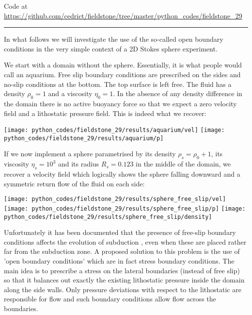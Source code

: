 

\begin{center}
Code at \url{https://github.com/cedrict/fieldstone/tree/master/python_codes/fieldstone_29}
\end{center}

\par\noindent\rule{\textwidth}{0.4pt}

\Literature \cite{chgv12}

In what follows we will investigate the use of the so-called open boundary conditions in 
the very simple context of a 2D Stokes sphere experiment. 

We start with a domain without the sphere. Essentially, it is what people would 
call an aquarium.
Free slip boundary conditions are prescribed on the sides and no-slip conditions at the bottom. 
The top surface is left free. The fluid has a density $\rho_0=1$ and a viscosity $\eta_0=1$.
In the absence of any density difference in the domain there is no active buoyancy force
so that we expect a zero velocity field and a lithostatic pressure field. 
This is indeed what we recover:  

\begin{center}
\texttt{[image: python\_codes/fieldstone\_29/results/aquarium/vel]}
\texttt{[image: python\_codes/fieldstone\_29/results/aquarium/p]}
\end{center}

If we now implement a sphere parametrised by its density $\rho_s=\rho_0+1$, its 
viscosity $\eta_s=10^3$ and its radius $R_s=0.123$ in the middle of the domain,  
we recover a velocity field which logically shows the sphere falling downward and 
a symmetric return flow of the fluid on each side:

\begin{center}
\texttt{[image: python\_codes/fieldstone\_29/results/sphere\_free\_slip/vel]}
\texttt{[image: python\_codes/fieldstone\_29/results/sphere\_free\_slip/p]}
\texttt{[image: python\_codes/fieldstone\_29/results/sphere\_free\_slip/density]}
\end{center}

Unfortunately it has been documented that the presence of free-slip 
boundary conditions affects the evolution of subduction \cite{chgv12}, 
even when these are placed rather far from the subduction zone. 
A proposed solution to this problem is the use of 'open boundary conditions'
which are in fact stress boundary conditions. 
The main idea is to prescribe a stress on the lateral boundaries (instead of free slip)
so that it balances out exactly the existing lithostatic pressure inside the domain 
along the side walls. Only pressure deviations with respect to the 
lithostatic are responsible for flow and such boundary conditions allow flow  
across the boundaries.

